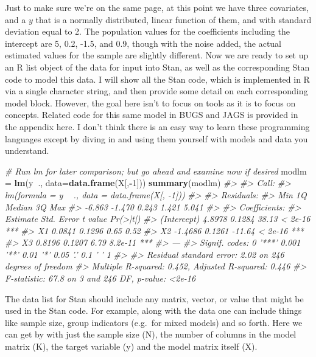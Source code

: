 \documentclass[]{book}
\newenvironment{Shaded}{\begin{snugshade}}{\end{snugshade}}
\newcommand{\CommentTok}[1]{\textcolor[rgb]{0.56,0.35,0.01}{\textit{#1}}}
\newcommand{\DataTypeTok}[1]{\textcolor[rgb]{0.13,0.29,0.53}{#1}}
\newcommand{\DecValTok}[1]{\textcolor[rgb]{0.00,0.00,0.81}{#1}}
\newcommand{\KeywordTok}[1]{\textcolor[rgb]{0.13,0.29,0.53}{\textbf{#1}}}
\newcommand{\NormalTok}[1]{#1}
\newcommand{\OperatorTok}[1]{\textcolor[rgb]{0.81,0.36,0.00}{\textbf{#1}}}
\newcommand{\StringTok}[1]{\textcolor[rgb]{0.31,0.60,0.02}{#1}}
\begin{document}
Just to make sure we're on the same page, at this point we have three covariates, and a \(y\) that is a normally distributed, linear function of them, and with standard deviation equal to 2. The population values for the coefficients including the intercept are 5, 0.2, -1.5, and 0.9, though with the noise added, the actual estimated values for the sample are slightly different. Now we are ready to set up an R list object of the data for input into Stan, as well as the corresponding Stan code to model this data. I will show all the Stan code, which is implemented in R via a single character string, and then provide some detail on each corresponding model block. However, the goal here isn't to focus on tools as it is to focus on concepts. Related code for this same model in BUGS and JAGS is provided in the appendix here. I don't think there is an easy way to learn these programming languages except by diving in and using them yourself with models and data you understand.

\begin{Shaded}
\begin{Highlighting}[]
\CommentTok{# Run lm for later comparison; but go ahead and examine now if desired}
\NormalTok{modlm =}\StringTok{ }\KeywordTok{lm}\NormalTok{(y}\OperatorTok{~}\NormalTok{., }\DataTypeTok{data=}\KeywordTok{data.frame}\NormalTok{(X[,}\OperatorTok{-}\DecValTok{1}\NormalTok{]))}
\KeywordTok{summary}\NormalTok{(modlm)}
\CommentTok{#> }
\CommentTok{#> Call:}
\CommentTok{#> lm(formula = y ~ ., data = data.frame(X[, -1]))}
\CommentTok{#> }
\CommentTok{#> Residuals:}
\CommentTok{#>    Min     1Q Median     3Q    Max }
\CommentTok{#> -6.863 -1.470  0.243  1.421  5.041 }
\CommentTok{#> }
\CommentTok{#> Coefficients:}
\CommentTok{#>             Estimate Std. Error t value Pr(>|t|)    }
\CommentTok{#> (Intercept)   4.8978     0.1284   38.13  < 2e-16 ***}
\CommentTok{#> X1            0.0841     0.1296    0.65     0.52    }
\CommentTok{#> X2           -1.4686     0.1261  -11.64  < 2e-16 ***}
\CommentTok{#> X3            0.8196     0.1207    6.79  8.2e-11 ***}
\CommentTok{#> ---}
\CommentTok{#> Signif. codes:  0 '***' 0.001 '**' 0.01 '*' 0.05 '.' 0.1 ' ' 1}
\CommentTok{#> }
\CommentTok{#> Residual standard error: 2.02 on 246 degrees of freedom}
\CommentTok{#> Multiple R-squared:  0.452,  Adjusted R-squared:  0.446 }
\CommentTok{#> F-statistic: 67.8 on 3 and 246 DF,  p-value: <2e-16}
\end{Highlighting}
\end{Shaded}

The data list for Stan should include any matrix, vector, or value that might be used in the Stan code. For example, along with the data one can include things like sample size, group indicators (e.g.~for mixed models) and so forth. Here we can get by with just the sample size (N), the number of columns in the model matrix (K), the target variable (y) and the model matrix itself (X).
\end{document}
